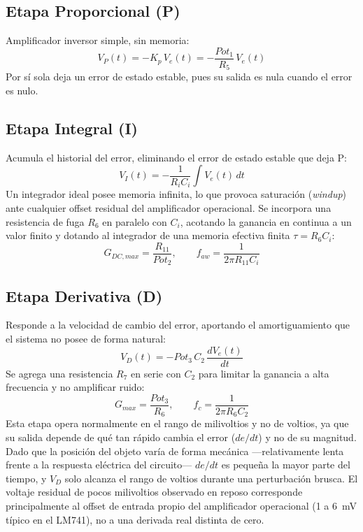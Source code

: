 \documentclass[conference]{IEEEtran}
\begin{document}
\subsection{Etapa Proporcional (P)}
Amplificador inversor simple, sin memoria:
\begin{equation}
V_P(t) = -K_p\,V_e(t) = -\frac{Pot_{1}}{R_5}\,V_e(t)
\label{eq:p}
\end{equation}
Por sí sola deja un error de estado estable, pues su salida es nula cuando el error es nulo.

\subsection{Etapa Integral (I)}
Acumula el historial del error, eliminando el error de estado estable que deja P:
\begin{equation}
V_I(t) = -\frac{1}{R_i C_i}\int V_e(t)\,dt
\label{eq:i}
\end{equation}
Un integrador ideal posee memoria infinita, lo que provoca saturación (\emph{windup}) ante cualquier offset residual del amplificador operacional. Se incorpora una resistencia de fuga $R_6$ en paralelo con $C_i$, acotando la ganancia en continua a un valor finito y dotando al integrador de una memoria efectiva finita $\tau = R_6 C_i$:
\begin{equation}
G_{DC,max} = \frac{R_{11}}{Pot_2}, \qquad f_{aw} = \frac{1}{2\pi R_{11} C_i}
\label{eq:i_aw}
\end{equation}

\subsection{Etapa Derivativa (D)}
Responde a la velocidad de cambio del error, aportando el amortiguamiento que el sistema no posee de forma natural:
\begin{equation}
V_D(t) = -Pot_{3}\,C_2\,\frac{dV_e(t)}{dt}
\label{eq:d}
\end{equation}
Se agrega una resistencia $R_7$ en serie con $C_2$ para limitar la ganancia a alta frecuencia y no amplificar ruido:
\begin{equation}
G_{max} = \frac{Pot_{3}}{R_6}, \qquad f_c = \frac{1}{2\pi R_6 C_2}
\label{eq:d_fc}
\end{equation}
Esta etapa opera normalmente en el rango de milivoltios y no de voltios, ya que su salida depende de qué tan rápido cambia el error ($de/dt$) y no de su magnitud. Dado que la posición del objeto varía de forma mecánica —relativamente lenta frente a la respuesta eléctrica del circuito— $de/dt$ es pequeña la mayor parte del tiempo, y $V_D$ solo alcanza el rango de voltios durante una perturbación brusca. El voltaje residual de pocos milivoltios observado en reposo corresponde principalmente al offset de entrada propio del amplificador operacional (1 a 6~mV típico en el LM741), no a una derivada real distinta de cero.
\end{document}
